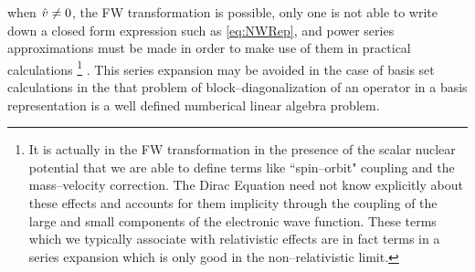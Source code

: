 when $\hat{v} \neq 0$, the FW transformation is possible, only one is not able to write down a closed
form expression such as \cref{eq:NWRep}, and power series approximations must be made in order to make
use of them in practical calculations 
\footnote{It is actually in the FW transformation in the presence of the scalar nuclear  potential 
that we are able to define terms like ``spin--orbit" coupling and the mass--velocity correction. The Dirac Equation need not know explicitly 
about these effects and accounts for them implicity through the coupling of the large and small components
of the electronic wave function. These terms which we typically associate with relativistic effects are in fact
terms in a series expansion which is only good in the non--relativistic limit.}
. 
This series expansion may be avoided in the case of basis set calculations 
in the that problem of block--diagonalization of an operator in a basis representation is a well defined
numberical linear algebra problem.

